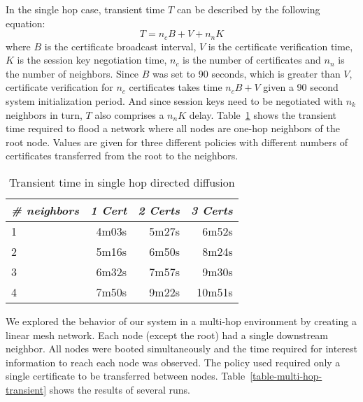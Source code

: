 In the single hop case, transient time $T$ can be described by the following 
equation:
\begin{displaymath}
T = n_c B + V + n_n K
\end{displaymath}
where $B$ is the certificate broadcast interval, $V$ is the
certificate verification time, $K$ is the session key negotiation
time, $n_c$ is the number of certificates and $n_n$ is the number of
neighbors. Since $B$ was set to 90 seconds, which is greater than $V$, 
certificate verification for $n_c$ certificates takes time $n_c B + V$
given a 90 second system initialization period. And since session keys
need to be negotiated with $n_k$ neighbors in turn, $T$ also comprises
a $n_nK$ delay.  Table~\ref{table-one-hop-transient} shows the
transient time required to flood a network where all nodes are one-hop
neighbors of the root node.  Values are given for three different
policies with different numbers of certificates transferred from the
root to the neighbors.
\begin{table}[tbhp]
  \newcommand\T{\rule{0pt}{2.1ex}}
  \centering
  \caption{Transient time in single hop directed diffusion}
  {
  \begin{tabular}{|l|r|r|r|} \hline
    \textit{\# neighbors} \T & \textit{1 Cert }
                             & \textit{2 Certs}
                             & \textit{3 Certs} \\ \hline \hline

    1 \T &  4m03s & 5m27s &  6m52s \\ \hline
    2 \T &  5m16s & 6m50s &  8m24s \\ \hline
    3 \T &  6m32s & 7m57s &  9m30s \\ \hline
    4 \T &  7m50s & 9m22s & 10m51s \\ \hline
  \end{tabular}
  }
  \label{table-one-hop-transient}
\end{table}

We explored the behavior of our system in a multi-hop environment by
creating a linear mesh network. Each node (except the root) had a
single downstream neighbor. All nodes were booted simultaneously and
the time required for interest information to reach each node was
observed. The policy used required only a single certificate to be
transferred between nodes.  Table~\ref{table-multi-hop-transient} shows
the results of several runs.

